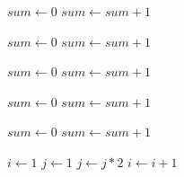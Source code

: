 \begin{enumerate}
\newpage

\begin{minipage}[t]{7cm}
\null 
 \begin{algorithm}[H] %
\DontPrintSemicolon
$sum \gets 0$\;
 {
	$sum \gets sum + 1$
}
\caption{{ } }
 \end{algorithm}
\end{minipage}%
\begin{minipage}[t]{7cm} %
\null
 \begin{algorithm}[H]
\DontPrintSemicolon

$sum \gets 0$\;
 {
	 {
		$sum \gets sum + 1$
	}
}
\caption{{} } 
  \end{algorithm}
\end{minipage}


\vspace*{15mm}

\begin{minipage}[t]{7cm}
\null 
 \begin{algorithm}[H]
\DontPrintSemicolon %
$sum \gets 0$\;
 {
	 {
		$sum \gets sum + 1$
	}
}
\caption{{} } 
  \end{algorithm}
\end{minipage}%
\begin{minipage}[t]{7cm}
\null
 \begin{algorithm}[H]
\DontPrintSemicolon%
$sum \gets 0$\;
 {
	 {
		$sum \gets sum + 1$
	}
}
\caption{{} }
  \end{algorithm}
\end{minipage}


\vspace*{15mm}


\begin{minipage}[t]{7cm}
\null 
 \begin{algorithm}[H]
\DontPrintSemicolon%
$sum \gets 0$\;
 {
	 {
		 {
			$sum \gets sum + 1$
		}
	}
}
\caption{{} }
  \end{algorithm}
\end{minipage}%
\begin{minipage}[t]{7cm}
\null
 \begin{algorithm}[H]
\DontPrintSemicolon %
$i \gets 1$\;
 {
	$j \gets 1$\;
	 {
		$j \gets j*2$
	}
	$i \gets i + 1$
}
\caption{{ } }
\end{algorithm}
\end{minipage}



\end{enumerate}
